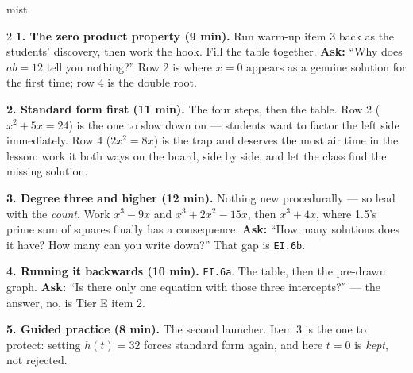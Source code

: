 \documentclass[10pt]{article}
\begin{document}
\boxguard
\begin{skillbox}[Lesson]{mist}
\begin{multicols}{2}
\textbf{1. The zero product property (9 min).} Run warm-up item 3 back as the students' discovery,
then work the hook. Fill the table together. \textbf{Ask:} ``Why does $ab=12$ tell you nothing?''
Row 2 is where $x=0$ appears as a genuine solution for the first time; row 4 is the double root.

\textbf{2. Standard form first (11 min).} The four steps, then the table. Row 2 ($x^2+5x=24$) is the
one to slow down on --- students want to factor the left side immediately. Row 4 ($2x^2=8x$) is the
trap and deserves the most air time in the lesson: work it both ways on the board, side by side, and
let the class find the missing solution.

\textbf{3. Degree three and higher (12 min).} Nothing new procedurally --- so lead with the
\emph{count}. Work $x^3-9x$ and $x^3+2x^2-15x$, then $x^3+4x$, where 1.5's prime sum of squares
finally has a consequence. \textbf{Ask:} ``How many solutions does it have? How many can you
write down?'' That gap is \texttt{EI.6b}.

\textbf{4. Running it backwards (10 min).} \texttt{EI.6a}. The table, then the pre-drawn graph.
\textbf{Ask:} ``Is there only one equation with those three intercepts?'' --- the answer, no, is
Tier E item 2.

\textbf{5. Guided practice (8 min).} The second launcher. Item 3 is the one to protect: setting
$h(t)=32$ forces standard form again, and here $t=0$ is \emph{kept}, not rejected.
\end{multicols}
\end{skillbox}
\end{document}
